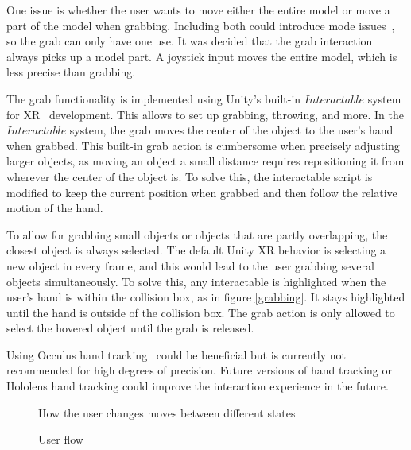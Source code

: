 \documentclass[a4paper]{report}
\begin{document}
One issue is whether the user wants to move either the entire model or move a part of the model when grabbing. Including both could introduce mode issues~\cite{experience_modes_nodate}, so the grab can only have one use.
It was decided that the grab interaction always picks up a model part. A joystick input moves the entire model, which is less precise than grabbing.

The grab functionality is implemented using Unity's built-in $Interactable$ system for XR~\cite{noauthor_xr_nodate} development. This allows to set up grabbing, throwing, and more.
In the $Interactable$ system, the grab moves the center of the object to the user's hand when grabbed. This built-in grab action is cumbersome when precisely adjusting larger objects, as moving an object a small distance requires repositioning it from wherever the center of the object is.
To solve this, the interactable script is modified to keep the current position when grabbed and then follow the relative motion of the hand.

To allow for grabbing small objects or objects that are partly overlapping, the closest object is always selected.
The default Unity XR behavior is selecting a new object in every frame, and this would lead to the user grabbing several objects simultaneously. To solve this, any interactable is highlighted when the user's hand is within the collision box, as in figure \ref{grabbing}. It stays highlighted until the hand is outside of the collision box. The grab action is only allowed to select the hovered object until the grab is released.

Using Occulus hand tracking~\cite{noauthor_set_nodate} could be beneficial but is currently not recommended for high degrees of precision. Future versions of hand tracking or Hololens hand tracking could improve the interaction experience in the future.


\begin{figure}[h!]
    \centering
	\hfill
	\caption{User flow}\label{flow}
  \small
  How the user changes moves between different states
\end{figure}
\end{document}
